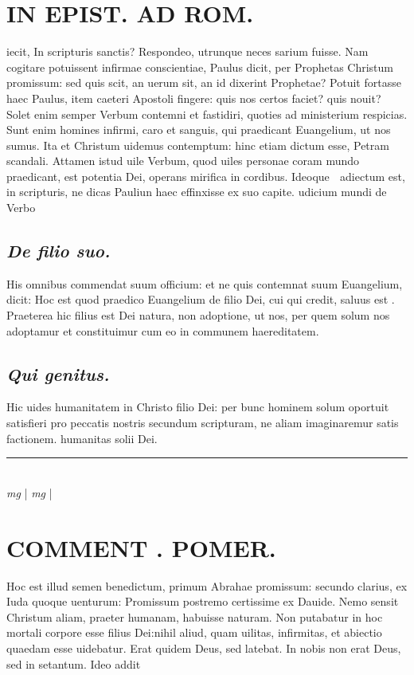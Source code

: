 \documentclass{article}
\begin{document}
\begin{pages}
\section*{IN EPIST. AD ROM.  }
\marginpar{[ p.5 ]}\pstart iecit, In scripturis sanctis? Respondeo, utrunque neces sarium fuisse. Nam cogitare potuissent infirmae conscientiae, Paulus dicit, per Prophetas Christum promissum: sed quis scit, an uerum sit, an id dixerint Prophetae? Potuit fortasse haec Paulus, item caeteri Apostoli fingere: quis nos certos faciet? quis nouit? Solet enim semper Verbum contemni et fastidiri, quoties ad ministerium respicias. Sunt enim homines infirmi, caro et sanguis, qui praedicant Euangelium, ut nos sumus. Ita et Christum uidemus contemptum: hinc etiam dictum esse, Petram scandali. Attamen istud uile Verbum, quod uiles personae coram mundo praedicant, est potentia Dei, operans mirifica in cordibus. Ideoque  adiectum est, in scripturis, ne dicas Pauliun haec effinxisse ex suo capite.  udicium mundi de Verbo\pend
{}
{}
\subsection*{\textit{De filio suo. }}\pstart His omnibus commendat suum officium: et ne quis contemnat suum Euangelium, dicit: Hoc est quod praedico Euangelium de filio Dei, cui qui credit, saluus est . Praeterea hic filius est Dei natura, non adoptione, ut nos, per quem solum nos adoptamur et constituimur cum eo in communem haereditatem.   \pend
{}
{}
\subsection*{\textit{Qui genitus. }}\pstart Hic uides humanitatem in Christo filio Dei: per bunc hominem solum oportuit satisfieri pro peccatis nostris secundum scripturam, ne aliam imaginaremur satis factionem.  humanitas solii Dei.  \pend
\vspace{0.5cm}\noindent
\vspace{0.2cm}\rule{1cm}{0.2pt}\\ 
\hspace{0.2cm}\textit{mg}
\footnotesize 
\normalsize| 
\hspace{0.2cm}\textit{mg}
\footnotesize 
\normalsize| 
\section*{COMMENT . POMER.  }\pstart Hoc est illud semen benedictum, primum Abrahae promissum: secundo clarius, ex Iuda quoque uenturum: Promissum postremo certissime ex Dauide.  \pend\pstart Nemo sensit Christum aliam, praeter humanam, habuisse naturam. Non putabatur in hoc mortali corpore esse filius Dei:nihil aliud, quam uilitas, infirmitas, et abiectio quaedam esse uidebatur. Erat quidem Deus, sed latebat. In nobis non erat Deus, sed in setantum. Ideo addit  \pend
{}
{}

\end{pages}
\end{document}
